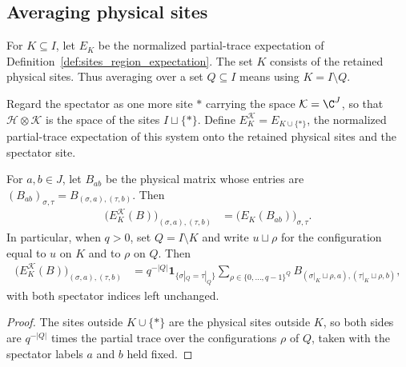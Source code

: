\subsection{Averaging physical sites}
\label{sec:qc_spectator_expectation}

For $K\subseteq I$, let $E_K$ be the normalized partial-trace expectation
of Definition~\ref{def:sites_region_expectation}. The set $K$ consists of the
retained physical sites. Thus averaging over a set $Q\subseteq I$
means using $K=I\setminus Q$.

\begin{definition}
    \label{def:qc_spectator_expectation}
    \leanok
    Regard the spectator as one more site $\ast$ carrying the space
    $\mathcal K=\C^J$, so that $\mathcal H\otimes\mathcal K$ is the space of
    the sites $I\sqcup\{\ast\}$. Define $E_K^{\mathcal K}=E_{K\cup\{\ast\}}$,
    the normalized partial-trace expectation of this system onto the retained
    physical sites and the spectator site.
\end{definition}

\begin{lemma}
    \label{thm:qc_spectator_blocks}
    \leanok
    For $a,b\in J$, let $B_{ab}$ be the physical matrix whose entries are
    $(B_{ab})_{\sigma,\tau}=B_{(\sigma,a),(\tau,b)}$. Then
    \begin{align}
        \bigl(E_K^{\mathcal K}(B)\bigr)_{(\sigma,a),(\tau,b)}
         & =\bigl(E_K(B_{ab})\bigr)_{\sigma,\tau}.
        \label{eq:qc_spectator_blocks}
    \end{align}
    In particular, when $q>0$, set $Q=I\setminus K$ and write
    $u\sqcup\rho$ for the configuration equal to $u$ on $K$ and to
    $\rho$ on $Q$. Then
    \begin{align}
        \bigl(E_K^{\mathcal K}(B)\bigr)_{(\sigma,a),(\tau,b)}
         & =q^{-|Q|}\mathbf1_{\{\sigma|_Q=\tau|_Q\}}
        \sum_{\rho\in\{0,\ldots,q-1\}^{Q}}
        B_{(\sigma|_K\sqcup\rho,a),(\tau|_K\sqcup\rho,b)},
        \label{eq:qc_spectator_trace}
    \end{align}
    with both spectator indices left unchanged.
\end{lemma}
\begin{proof}
    \leanok
    The sites outside $K\cup\{\ast\}$ are the physical sites outside $K$, so
    both sides are $q^{-|Q|}$ times the partial trace over the configurations
    $\rho$ of $Q$, taken with the spectator labels $a$ and $b$ held fixed.
\end{proof}

